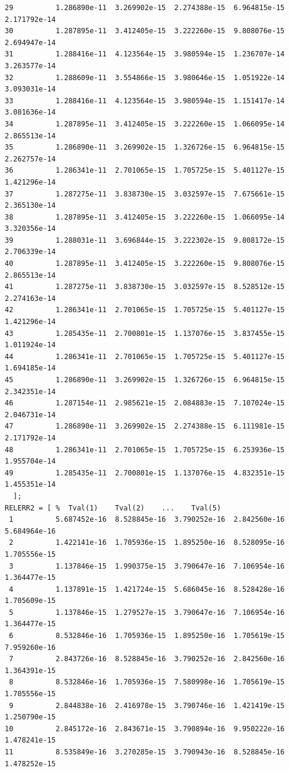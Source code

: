 \documentclass[a4paper,10pt]{report}%
\begin{document}
\begin{lstlisting}
29          1.286890e-11  3.269902e-15  2.274388e-15  6.964815e-15  2.171792e-14
30          1.287895e-11  3.412405e-15  3.222260e-15  9.808076e-15  2.694947e-14
31          1.288416e-11  4.123564e-15  3.980594e-15  1.236707e-14  3.263577e-14
32          1.288609e-11  3.554866e-15  3.980646e-15  1.051922e-14  3.093031e-14
33          1.288416e-11  4.123564e-15  3.980594e-15  1.151417e-14  3.081636e-14
34          1.287895e-11  3.412405e-15  3.222260e-15  1.066095e-14  2.865513e-14
35          1.286890e-11  3.269902e-15  1.326726e-15  6.964815e-15  2.262757e-14
36          1.286341e-11  2.701065e-15  1.705725e-15  5.401127e-15  1.421296e-14
37          1.287275e-11  3.838730e-15  3.032597e-15  7.675661e-15  2.365130e-14
38          1.287895e-11  3.412405e-15  3.222260e-15  1.066095e-14  3.320356e-14
39          1.288031e-11  3.696844e-15  3.222302e-15  9.808172e-15  2.706339e-14
40          1.287895e-11  3.412405e-15  3.222260e-15  9.808076e-15  2.865513e-14
41          1.287275e-11  3.838730e-15  3.032597e-15  8.528512e-15  2.274163e-14
42          1.286341e-11  2.701065e-15  1.705725e-15  5.401127e-15  1.421296e-14
43          1.285435e-11  2.700801e-15  1.137076e-15  3.837455e-15  1.011924e-14
44          1.286341e-11  2.701065e-15  1.705725e-15  5.401127e-15  1.694185e-14
45          1.286890e-11  3.269902e-15  1.326726e-15  6.964815e-15  2.342351e-14
46          1.287154e-11  2.985621e-15  2.084883e-15  7.107024e-15  2.046731e-14
47          1.286890e-11  3.269902e-15  2.274388e-15  6.111981e-15  2.171792e-14
48          1.286341e-11  2.701065e-15  1.705725e-15  6.253936e-15  1.955704e-14
49          1.285435e-11  2.700801e-15  1.137076e-15  4.832351e-15  1.455351e-14
  ];
RELERR2 = [ %  Tval(1)    Tval(2)    ...    Tval(5)
 1          5.687452e-16  8.528845e-16  3.790252e-16  2.842560e-16  5.684964e-16
 2          1.422141e-16  1.705936e-15  1.895250e-16  8.528095e-16  1.705556e-15
 3          1.137846e-15  1.990375e-15  3.790647e-16  7.106954e-16  1.364477e-15
 4          1.137891e-15  1.421724e-15  5.686045e-16  8.528428e-16  1.705609e-15
 5          1.137846e-15  1.279527e-15  3.790647e-16  7.106954e-16  1.364477e-15
 6          8.532846e-16  1.705936e-15  1.895250e-16  1.705619e-15  7.959260e-16
 7          2.843726e-16  8.528845e-16  3.790252e-16  2.842560e-16  1.364391e-15
 8          8.532846e-16  1.705936e-15  7.580998e-16  1.705619e-15  1.705556e-15
 9          2.844838e-16  2.416978e-15  3.790746e-16  1.421419e-15  1.250790e-15
10          2.845172e-16  2.843671e-15  3.790894e-16  9.950222e-16  1.478241e-15
11          8.535849e-16  3.270285e-15  3.790943e-16  8.528845e-16  1.478252e-15

\end{lstlisting}
\end{document}
